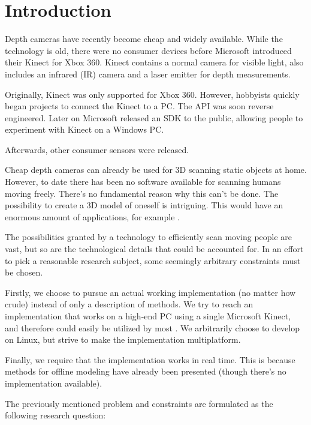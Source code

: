 \chapter{Introduction}


 Depth cameras have recently become cheap and widely available. While the technology is old, there were no consumer devices before Microsoft introduced their Kinect for Xbox 360. Kinect contains a normal camera for visible light,  also includes an infrared (IR) camera and a laser emitter for depth measurements. 


Originally, Kinect was only supported for Xbox 360. However, hobbyists quickly began projects to connect the Kinect to a PC. The API was soon reverse engineered. Later on Microsoft released an SDK to the public, allowing people to experiment with Kinect on a Windows PC.

Afterwards, other consumer sensors were released. 

Cheap depth cameras can already be used for 3D scanning static objects at home. However, to date there has been no software available for scanning humans moving freely. There's no fundamental reason why this can't be done. The possibility to create a 3D model of oneself is intriguing. This would have an enormous amount of applications, for example .


The possibilities granted by a technology to efficiently scan moving people are vast, but so are the technological details that could be accounted for. In an effort to pick a reasonable research subject, some seemingly arbitrary constraints must be chosen.

Firstly, we choose to pursue an actual working implementation (no matter how crude) instead of only a description of methods. We try to reach an implementation that works on a high-end PC using a single Microsoft Kinect, and therefore could easily be utilized by most . We arbitrarily choose to develop on Linux, but strive to make the implementation multiplatform.

Finally, we require that the implementation works in real time. This is because methods for offline modeling have already been presented (though there's no implementation available).

The previously mentioned problem and constraints are formulated as the following research question:

